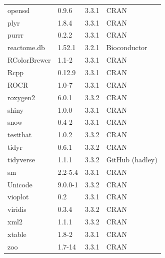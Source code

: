 \begin{longtable}{llll}
\rowcolor{black!10}
openssl      & 0.9.6          & 3.3.1 & \gls{CRAN}            \\
\rowcolor{black!5}
plyr         & 1.8.4          & 3.3.1 & \gls{CRAN}            \\
\rowcolor{black!10}
purrr        & 0.2.2          & 3.3.1 & \gls{CRAN}            \\
\rowcolor{black!5}
reactome.db  & 1.52.1         & 3.2.1 & Bioconductor    \\
\rowcolor{black!10}
RColorBrewer & 1.1-2          & 3.3.1 & \gls{CRAN}            \\
\rowcolor{black!5}
Rcpp         & 0.12.9         & 3.3.1 & \gls{CRAN}            \\
\rowcolor{black!10}
ROCR         & 1.0-7          & 3.3.1 & \gls{CRAN}            \\
\rowcolor{black!5}
roxygen2     & 6.0.1          & 3.3.2 & \gls{CRAN}            \\
\rowcolor{black!10}
shiny        & 1.0.0          & 3.3.1 & \gls{CRAN}            \\
\rowcolor{black!5}
snow         & 0.4-2          & 3.3.1 & \gls{CRAN}            \\
\rowcolor{black!10}
testthat     & 1.0.2          & 3.3.2 & \gls{CRAN}            \\
\rowcolor{black!5}
tidyr        & 0.6.1          & 3.3.2 & \gls{CRAN}            \\
\rowcolor{black!10}
tidyverse    & 1.1.1          & 3.3.2 & GitHub (hadley) \\
\rowcolor{black!5}
sm           & 2.2-5.4        & 3.3.1 & \gls{CRAN}            \\
\rowcolor{black!10}
Unicode      & 9.0.0-1        & 3.3.2 & \gls{CRAN}            \\
\rowcolor{black!5}
vioplot      & 0.2            & 3.3.1 & \gls{CRAN}            \\
\rowcolor{black!10}
viridis      & 0.3.4          & 3.3.2 & \gls{CRAN}            \\
\rowcolor{black!5}
xml2         & 1.1.1          & 3.3.2 & \gls{CRAN}            \\
\rowcolor{black!10}
xtable       & 1.8-2          & 3.3.1 & \gls{CRAN}            \\
\rowcolor{black!5}
zoo          & 1.7-14         & 3.3.1 & \gls{CRAN}            \\

\end{longtable}
